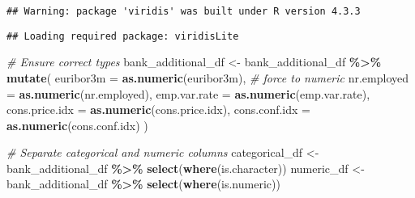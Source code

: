 \documentclass[
]{article}
\newenvironment{Shaded}{\begin{snugshade}}{\end{snugshade}}
\newcommand{\AttributeTok}[1]{\textcolor[rgb]{0.13,0.29,0.53}{#1}}
\newcommand{\CommentTok}[1]{\textcolor[rgb]{0.56,0.35,0.01}{\textit{#1}}}
\newcommand{\FunctionTok}[1]{\textcolor[rgb]{0.13,0.29,0.53}{\textbf{#1}}}
\newcommand{\NormalTok}[1]{#1}
\newcommand{\OtherTok}[1]{\textcolor[rgb]{0.56,0.35,0.01}{#1}}
\newcommand{\SpecialCharTok}[1]{\textcolor[rgb]{0.81,0.36,0.00}{\textbf{#1}}}
\begin{document}
\begin{verbatim}
## Warning: package 'viridis' was built under R version 4.3.3
\end{verbatim}

\begin{verbatim}
## Loading required package: viridisLite
\end{verbatim}

\begin{Shaded}
\begin{Highlighting}[]
\CommentTok{\# Ensure correct types}
\NormalTok{bank\_additional\_df }\OtherTok{\textless{}{-}}\NormalTok{ bank\_additional\_df }\SpecialCharTok{\%\textgreater{}\%}
  \FunctionTok{mutate}\NormalTok{(}
    \AttributeTok{euribor3m =} \FunctionTok{as.numeric}\NormalTok{(euribor3m),  }\CommentTok{\# force to numeric}
    \AttributeTok{nr.employed =} \FunctionTok{as.numeric}\NormalTok{(nr.employed),}
    \AttributeTok{emp.var.rate =} \FunctionTok{as.numeric}\NormalTok{(emp.var.rate),}
    \AttributeTok{cons.price.idx =} \FunctionTok{as.numeric}\NormalTok{(cons.price.idx),}
    \AttributeTok{cons.conf.idx =} \FunctionTok{as.numeric}\NormalTok{(cons.conf.idx)}
\NormalTok{  )}

\CommentTok{\# Separate categorical and numeric columns}
\NormalTok{categorical\_df }\OtherTok{\textless{}{-}}\NormalTok{ bank\_additional\_df }\SpecialCharTok{\%\textgreater{}\%} \FunctionTok{select}\NormalTok{(}\FunctionTok{where}\NormalTok{(is.character))}
\NormalTok{numeric\_df     }\OtherTok{\textless{}{-}}\NormalTok{ bank\_additional\_df }\SpecialCharTok{\%\textgreater{}\%} \FunctionTok{select}\NormalTok{(}\FunctionTok{where}\NormalTok{(is.numeric))}


\end{Highlighting}
\end{Shaded}
\end{document}
